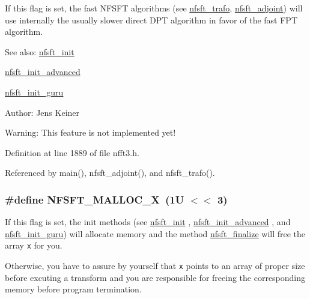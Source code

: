 If this flag is set, the fast NFSFT algorithms (see \hyperlink{group__nfsft_g5796fc68c432d46dfcab7abd8c56ee22}{nfsft\_\-trafo}, \hyperlink{group__nfsft_g813bb48d404c7286310733c99a81a169}{nfsft\_\-adjoint}) will use internally the usually slower direct DPT algorithm in favor of the fast FPT algorithm. 

\begin{Desc}
\item[See also:]\hyperlink{group__nfsft_g65cda3f4a3edc5eb39c697cf34b1f0b9}{nfsft\_\-init} 

\hyperlink{group__nfsft_ge7dca3e41afdb39e8c518af414878c18}{nfsft\_\-init\_\-advanced} 

\hyperlink{group__nfsft_g60466ed37643b6b7b7c1638056604d2b}{nfsft\_\-init\_\-guru} \end{Desc}
\begin{Desc}
\item[Author:]Jens Keiner \end{Desc}
\begin{Desc}
\item[Warning:]This feature is not implemented yet! \end{Desc}


Definition at line 1889 of file nfft3.h.

Referenced by main(), nfsft\_\-adjoint(), and nfsft\_\-trafo().\hypertarget{group__nfsft_g02e4313d15b24c79e6802f853d452454}{
\subsubsection{\setlength{\rightskip}{0pt plus 5cm}\#define NFSFT\_\-MALLOC\_\-X~(1U $<$$<$ 3)}}
\label{group__nfsft_g02e4313d15b24c79e6802f853d452454}


If this flag is set, the init methods (see \hyperlink{group__nfsft_g65cda3f4a3edc5eb39c697cf34b1f0b9}{nfsft\_\-init} , \hyperlink{group__nfsft_ge7dca3e41afdb39e8c518af414878c18}{nfsft\_\-init\_\-advanced} , and \hyperlink{group__nfsft_g60466ed37643b6b7b7c1638056604d2b}{nfsft\_\-init\_\-guru}) will allocate memory and the method \hyperlink{group__nfsft_ga63e193a27d84059742ff25ff81e2ed1}{nfsft\_\-finalize} will free the array {\tt x} for you. 

Otherwise, you have to assure by yourself that {\tt x} points to an array of proper size before excuting a transform and you are responsible for freeing the corresponding memory before program termination.

